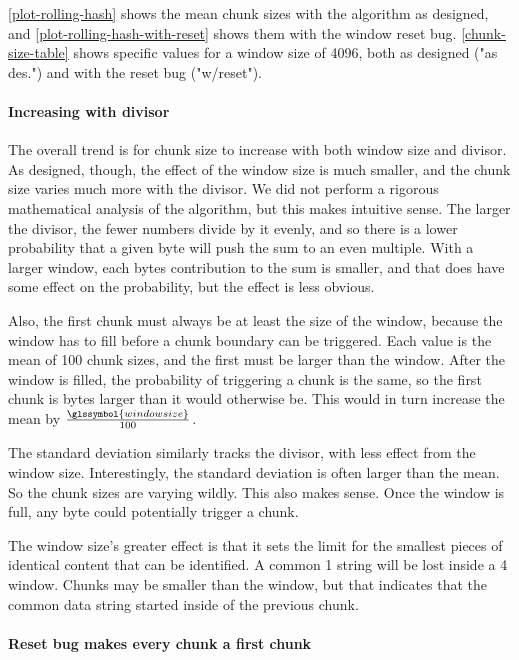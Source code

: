 \autoref{plot-rolling-hash} shows the mean chunk sizes with the algorithm as
designed, and \autoref{plot-rolling-hash-with-reset} shows them with the window
reset bug. \autoref{chunk-size-table} shows specific values for a window size of
4096, both as designed ("as des.") and with the reset bug ("w/reset").

\paragraph{Increasing with divisor}

The overall trend is for chunk size to increase with both window size and
divisor. As designed, though, the effect of the window size is much smaller, and
the chunk size varies much more with the divisor. We did not perform a rigorous
mathematical analysis of the algorithm, but this makes intuitive sense. The
larger the divisor, the fewer numbers divide by it evenly, and so there is a
lower probability that a given byte will push the sum to an even multiple. With
a larger window, each bytes contribution to the sum is smaller, and that does
have some effect on the probability, but the effect is less obvious.

Also, the first chunk must always be at least the size of the window, because
the window has to fill before a chunk boundary can be triggered. Each value is
the mean of 100 chunk sizes, and the first must be larger than the window. After
the window is filled, the probability of triggering a chunk is the same, so the
first chunk is  bytes larger than it would otherwise be.
This would in turn increase the mean by $\frac{\glssymbol{windowsize}}{100}$.

The standard deviation similarly tracks the divisor, with less effect from the
window size. Interestingly, the standard deviation is often larger than the
mean. So the chunk sizes are varying wildly. This also makes sense. Once the
window is full, any byte could potentially trigger a chunk.

The window size's greater effect is that it sets the limit for the smallest
pieces of identical content that can be identified. A common \SI{1}{\kib} string
will be lost inside a \SI{4}{\kib} window. Chunks may be smaller than the
window, but that indicates that the common data string started inside of the
previous chunk.



\paragraph{Reset bug makes every chunk a first chunk}

